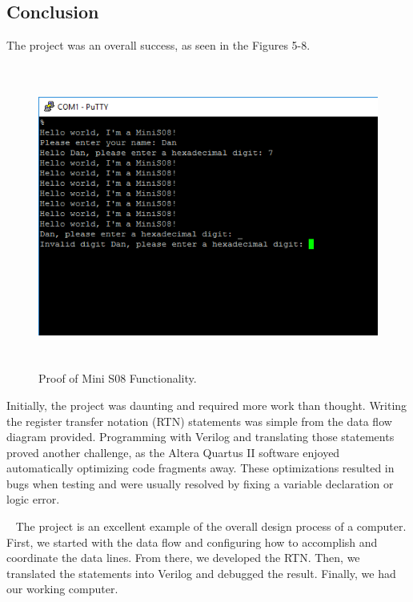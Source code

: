 \documentclass[letterpaper, 12pt]{article}
\begin{document}
\begin{flushleft}
\newpage
\section*{Conclusion}
The project was an overall success, as seen in the Figures 5-8.
 \begin{figure}[H]
	\centering
	\includegraphics[width=\linewidth,height=10cm,keepaspectratio]{minis08_operation.PNG}
	\caption[MiniS08 Operation Proof]{Proof of Mini S08 Functionality.}
	\label{fig:arch}
\end{figure}

Initially, the project was daunting and required more work than thought.  Writing the register transfer notation (RTN) statements was simple from the data flow diagram provided.  Programming with Verilog and translating those statements proved another challenge, as the Altera Quartus II software enjoyed automatically optimizing code fragments away.  These optimizations resulted in bugs when testing and were usually resolved by fixing a variable declaration or logic error.

~\newline
The project is an excellent example of the overall design process of a computer.  First, we started with the data flow and configuring how to accomplish and coordinate the data lines.  From there, we developed the RTN.  Then, we translated the statements into Verilog and debugged the result.  Finally, we had our working computer.


\end{flushleft}
\end{document}
